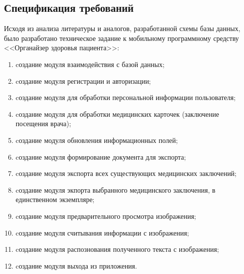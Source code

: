 \subsection{Спецификация требований}
\label{sub:practice:tab_task}
Исходя из анализа литературы и аналогов, разработанной схемы базы данных, было разработано техническое задание к мобильному программному средству <<Органайзер здоровья пациента>>: 
\begin{enumerate}
	\item cоздание модуля взаимодействия с базой данных;
	\item cоздание модуля регистрации и авторизации;
	\item cоздание модуля для обработки персональной информации пользователя;
	\item cоздание модуля для обработки медицинских карточек (заключение посещения врача);
	\item cоздание модуля обновления информационных полей;
	\item cоздание модуля формирование документа для экспорта;
	\item cоздание модуля экспорта всех существующих медицинских заключений;
	\item cоздание модуля экпорта выбранного медицинского заключения, в единственном экземпляре;
	\item cоздание модуля предварительного просмотра изображения;
	\item cоздание модуля считывания информации с изображения;
	\item cоздание модуля распознования полученного текста с изображения;
	\item cоздание модуля выхода из приложения.
\end{enumerate}

